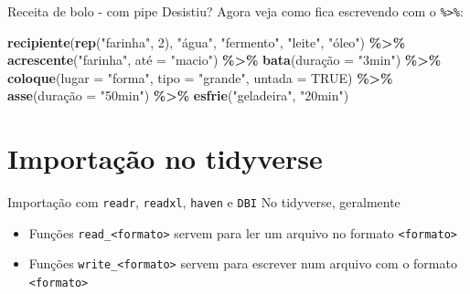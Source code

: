 \documentclass[
  10pt,
  ignorenonframetext,
]{beamer}
\newenvironment{Shaded}{\begin{snugshade}}{\end{snugshade}}
\newcommand{\DataTypeTok}[1]{\textcolor[rgb]{0.13,0.29,0.53}{#1}}
\newcommand{\DecValTok}[1]{\textcolor[rgb]{0.00,0.00,0.81}{#1}}
\newcommand{\KeywordTok}[1]{\textcolor[rgb]{0.13,0.29,0.53}{\textbf{#1}}}
\newcommand{\NormalTok}[1]{#1}
\newcommand{\OperatorTok}[1]{\textcolor[rgb]{0.81,0.36,0.00}{\textbf{#1}}}
\newcommand{\OtherTok}[1]{\textcolor[rgb]{0.56,0.35,0.01}{#1}}
\newcommand{\StringTok}[1]{\textcolor[rgb]{0.31,0.60,0.02}{#1}}
\providecommand{\tightlist}{%
  \setlength{\itemsep}{0pt}\setlength{\parskip}{0pt}}
\begin{document}
\begin{frame}[fragile]{Receita de bolo - com pipe}
\protect\hypertarget{receita-de-bolo---com-pipe}{}
Desistiu? Agora veja como fica escrevendo com o
\texttt{\%\textgreater{}\%}:

\begin{Shaded}
\begin{Highlighting}[]
\KeywordTok{recipiente}\NormalTok{(}\KeywordTok{rep}\NormalTok{(}\StringTok{"farinha"}\NormalTok{, }\DecValTok{2}\NormalTok{), }\StringTok{"água"}\NormalTok{, }\StringTok{"fermento"}\NormalTok{, }\StringTok{"leite"}\NormalTok{, }\StringTok{"óleo"}\NormalTok{) }\OperatorTok{\%\textgreater{}\%}
\StringTok{  }\KeywordTok{acrescente}\NormalTok{(}\StringTok{"farinha"}\NormalTok{, até =}\StringTok{ "macio"}\NormalTok{) }\OperatorTok{\%\textgreater{}\%}
\StringTok{  }\KeywordTok{bata}\NormalTok{(duração =}\StringTok{ "3min"}\NormalTok{) }\OperatorTok{\%\textgreater{}\%}
\StringTok{  }\KeywordTok{coloque}\NormalTok{(}\DataTypeTok{lugar =} \StringTok{"forma"}\NormalTok{, }\DataTypeTok{tipo =} \StringTok{"grande"}\NormalTok{, }\DataTypeTok{untada =} \OtherTok{TRUE}\NormalTok{) }\OperatorTok{\%\textgreater{}\%}
\StringTok{  }\KeywordTok{asse}\NormalTok{(duração =}\StringTok{ "50min"}\NormalTok{) }\OperatorTok{\%\textgreater{}\%}
\StringTok{  }\KeywordTok{esfrie}\NormalTok{(}\StringTok{"geladeira"}\NormalTok{, }\StringTok{"20min"}\NormalTok{)}
\end{Highlighting}
\end{Shaded}
\end{frame}

\hypertarget{importauxe7uxe3o-no-tidyverse}{%
\section{Importação no tidyverse}\label{importauxe7uxe3o-no-tidyverse}}

\begin{frame}[fragile]{Importação com \texttt{readr}, \texttt{readxl},
\texttt{haven} e \texttt{DBI}}
\protect\hypertarget{importauxe7uxe3o-com-readr-readxl-haven-e-dbi}{}
No tidyverse, geralmente

\begin{itemize}
\tightlist
\item
  Funções \texttt{read\_\textless{}formato\textgreater{}} servem para
  ler um arquivo no formato \texttt{\textless{}formato\textgreater{}}
\item
  Funções \texttt{write\_\textless{}formato\textgreater{}} servem para
  escrever num arquivo com o formato
  \texttt{\textless{}formato\textgreater{}}
\end{itemize}
\end{frame}
\end{document}
